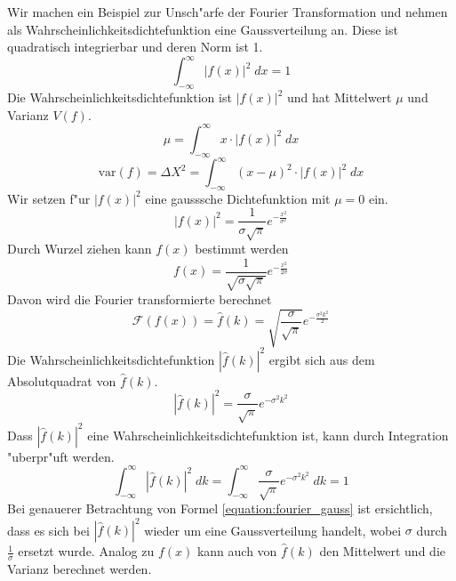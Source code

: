 \begin{refsection}
Wir machen ein Beispiel zur Unsch"arfe der Fourier Transformation und nehmen als Wahrscheinlichkeitsdichtefunktion eine Gaussverteilung an.
Diese ist quadratisch integrierbar und deren Norm ist 1.
\begin{equation}
	\int_{-\infty}^{\infty} |f(x)|^{2} \; dx = 1
\end{equation}
Die Wahrscheinlichkeitsdichtefunktion ist $|f(x)|^{2}$ und hat Mittelwert $\mu$ und Varianz $V(f)$.
\begin{equation}
	\mu = \int_{-\infty}^{\infty} x \cdot |f(x)|^{2} \; dx
\end{equation}
\begin{equation}	
	\text{var}(f) = \varDelta X^{2} = \int_{-\infty}^{\infty} (x-\mu)^{2} \cdot |f(x)|^{2} \; dx
	\label{equation:varianz1}
\end{equation}
Wir setzen f"ur $|f(x)|^{2}$ eine gausssche Dichtefunktion mit $\mu = 0$ ein.
\begin{equation}
	|f(x)|^{2}  = \dfrac{1}{\sigma \sqrt{\pi}}e^{-\frac{x^{2}}{\sigma^{2}}}
\end{equation}
Durch Wurzel ziehen kann $f(x)$ bestimmt werden
 \begin{equation}
 	f(x) =\dfrac{1}{\sqrt{\sigma\sqrt{\pi}} }e^{-\frac{x^{2}}{2\sigma}} 
 \end{equation}
Davon wird die Fourier transformierte berechnet
 \begin{equation}
 	\mathcal{F}(f(x)) = \hat{f}(k) = \sqrt{\dfrac{\sigma}{\sqrt{\pi}} }e^{-\frac{\sigma^{2} k^{2}}{2}}
 \end{equation}
Die Wahrscheinlichkeitsdichtefunktion $|\hat{f}(k)|^{2}$ ergibt sich aus dem Absolutquadrat von $\hat{f}(k)$.
\begin{equation}
	|\hat{f}(k)|^{2} = \dfrac{\sigma}{\sqrt{\pi} }e^{-\sigma^{2} k^{2}}
	\label{equation:fourier_gauss}
\end{equation}
Dass $|\hat{f}(k)|^{2}$ eine Wahrscheinlichkeitsdichtefunktion ist, kann durch Integration "uberpr"uft werden.
\begin{equation}
	\int_{-\infty}^{\infty}  |\hat{f}(k)|^{2} \; dk = \int_{-\infty}^{\infty} \dfrac{\sigma}{\sqrt{\pi} }e^{-\sigma^{2} k^{2}} \; dk = 1
\end{equation}
Bei genauerer Betrachtung von Formel \ref{equation:fourier_gauss} ist ersichtlich, dass es sich bei $|\hat{f}(k)|^{2}$ wieder um eine Gaussverteilung handelt, wobei $\sigma$ durch $\frac{1}{\sigma}$ ersetzt wurde.
Analog zu $f(x)$ kann auch von $\hat{f}(k)$ den Mittelwert und die Varianz berechnet werden.

\end{refsection}
